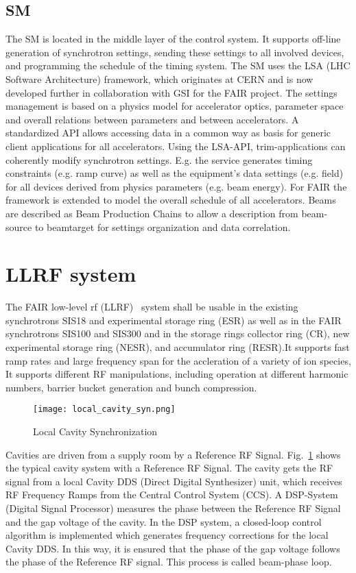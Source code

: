 \subsection{SM}
The \gls{SM} is located in the middle layer of the control system. It supports off-line generation of synchrotron settings, sending these settings to all involved devices,
and programming the schedule of the timing system. The SM uses the LSA (LHC Software Architecture) framework, which originates at CERN and is now developed further in collaboration with GSI for the FAIR project. The settings management is based on a physics model for accelerator optics, parameter space and overall relations between parameters and between accelerators. A standardized API allows accessing data in a common way as basis for generic client applications for all accelerators. Using the LSA-API, trim-applications can coherently modify synchrotron settings. E.g. the service generates timing constraints (e.g. ramp curve) as well as the equipment’s data settings (e.g. field) for all devices derived from physics parameters (e.g. beam energy). For FAIR the framework is extended to model the overall schedule of all accelerators. Beams are described as Beam Production
Chains to allow a description from beam-source to beamtarget for settings organization and data correlation.

\section{LLRF system}
The FAIR low-level rf (\gls{LLRF})~\cite{klingbeil_new_2011} system shall be usable in the existing synchrotrons SIS18 and experimental storage ring (\gls{ESR}) as well as in the FAIR synchrotrons SIS100 and SIS300 and in the storage rings collector ring (\gls{CR}), new experimental storage ring (\gls{NESR}), and accumulator ring (\gls{RESR}).It supports fast ramp rates and large frequency span for the accleration of a variety of ion species, It supports different RF manipulations, including operation at different harmonic numbers, barrier bucket generation and bunch compression. 
\begin{figure}[H]
   \centering   
   \texttt{[image: local\_cavity\_syn.png]}
   \caption{Local Cavity Synchronization}
   \label{local_cavity_syn}
\end{figure}
Cavities are driven from a supply room by a Reference RF Signal. Fig.~\ref{local_cavity_syn} shows the typical cavity system with a Reference RF Signal. The cavity gets the RF signal from a local Cavity DDS (Direct Digital Synthesizer) unit, which receives RF Frequency Ramps from the Central Control System (\gls{CCS}). A \gls{DSP}-System (Digital Signal Processor) measures the phase between the Reference RF Signal and the gap voltage of the cavity. In the DSP system, a closed-loop control algorithm is implemented which generates frequency corrections for the local Cavity DDS. In this way, it is ensured that the phase of the gap voltage follows the phase of the Reference RF signal. This process is called beam-phase loop.


